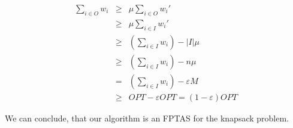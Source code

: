 \begin{description}
$$\begin{array}{rcl}
    \underset{i \in O}{\sum} w_i &\geq& \mu \underset{i \in O}{\sum} w_i'\\
        &\geq& \mu \underset{i \in I}{\sum} w_i'\\
        &\geq& (\underset{i \in I}{\sum} w_i) - |I|\mu\\
        &\geq& (\underset{i \in I}{\sum} w_i) - n \mu\\
        &=& (\underset{i \in I}{\sum} w_i) - \varepsilon M\\
        &\geq& OPT - \varepsilon OPT = (1-\varepsilon) OPT
\end{array}$$ 

We can conclude, that our algorithm is an FPTAS for the knapsack problem.
\end{description}

